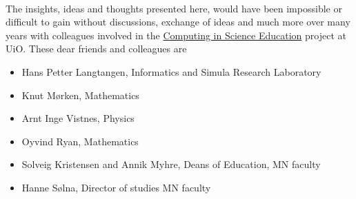 \documentclass[%
twoside,                 %
final,                   %
10pt]{article}
\begin{document}
\paragraph{}
The insights, ideas and thoughts presented here, would have been impossible or difficult to gain without discussions, exchange of ideas and much more over many years with colleagues involved in the \href{{http://www.mn.uio.no/english/about/collaboration/cse/}}{Computing in Science Education} project at UiO. These dear friends and colleagues  are 
\begin{itemize}
\item Hans Petter Langtangen, Informatics and Simula Research Laboratory

\item Knut Mørken, Mathematics

\item Arnt Inge Vistnes, Physics

\item Oyvind Ryan, Mathematics

\item Solveig Kristensen and Annik Myhre, Deans of Education, MN faculty

\item Hanne Sølna, Director of studies MN faculty
\end{itemize}

\noindent












\printindex
\end{document}
